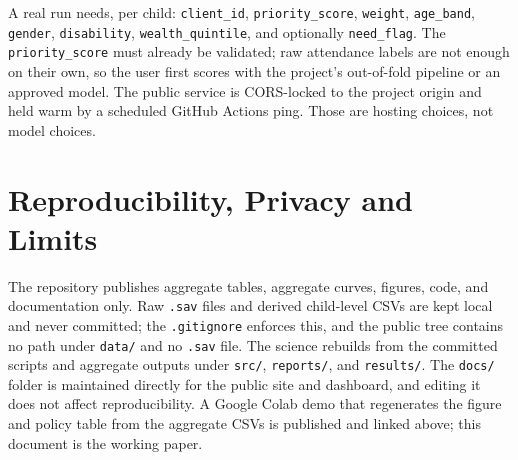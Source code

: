 \documentclass[12.1pt,a4paper]{article}
\begin{document}
\begin{table}[H]
\centering
\renewcommand{\arraystretch}{1.25}
\scriptsize
{}
\caption{Dashboard paths. Restricted or third-party identifiable records, and very large lists, should use the local download rather than the public server.}
\label{tab:paths}
\end{table}

A real run needs, per child: \texttt{client\_id}, \texttt{priority\_score}, \texttt{weight}, \texttt{age\_band}, \texttt{gender}, \texttt{disability}, \texttt{wealth\_quintile}, and optionally \texttt{need\_flag}. The \texttt{priority\_score} must already be validated; raw attendance labels are not enough on their own, so the user first scores with the project's out-of-fold pipeline or an approved model. The public service is CORS-locked to the project origin and held warm by a scheduled GitHub Actions ping. Those are hosting choices, not model choices.

\section{Reproducibility, Privacy and Limits}

The repository publishes aggregate tables, aggregate curves, figures, code, and documentation only. Raw \texttt{.sav} files and derived child-level CSVs are kept local and never committed; the \texttt{.gitignore} enforces this, and the public tree contains no path under \texttt{data/} and no \texttt{.sav} file. The science rebuilds from the committed scripts and aggregate outputs under \texttt{src/}, \texttt{reports/}, and \texttt{results/}. The \texttt{docs/} folder is maintained directly for the public site and dashboard, and editing it does not affect reproducibility. A Google Colab demo that regenerates the figure and policy table from the aggregate CSVs is published and linked above; this document is the working paper.
\end{document}
